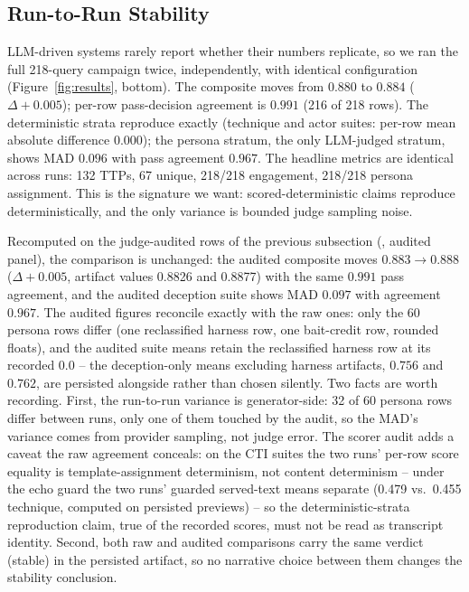

\subsection{Run-to-Run Stability}
\label{sec:stability}

LLM-driven systems rarely report whether their numbers replicate, so we
ran the full 218-query campaign twice, independently, with identical
configuration (Figure~\ref{fig:results}, bottom). The composite moves
from $0.880$ to $0.884$ ($\Delta
+0.005$); per-row pass-decision agreement is $0.991$ (216 of 218 rows).
The deterministic strata reproduce exactly (technique and actor suites:
per-row mean absolute difference $0.000$); the persona stratum, the only
LLM-judged stratum, shows MAD $0.096$ with pass agreement $0.967$. The
headline metrics are identical across runs: 132 TTPs, 67 unique,
218/218 engagement, 218/218 persona assignment. This is the signature we
want: scored-deterministic claims reproduce deterministically, and the
only variance is bounded judge sampling noise.

Recomputed on the judge-audited rows of the previous subsection
(, audited panel), the
comparison is unchanged: the audited composite moves $0.883\to0.888$
($\Delta+0.005$, artifact values 0.8826 and 0.8877) with the same $0.991$ pass
agreement, and the audited
deception suite shows MAD $0.097$ with agreement $0.967$. The audited
figures reconcile exactly with the raw ones: only the 60 persona rows
differ (one reclassified harness row, one bait-credit row, rounded
floats), and the audited suite means retain the reclassified harness
row at its recorded 0.0 -- the deception-only means excluding harness
artifacts, $0.756$ and $0.762$, are persisted alongside rather than
chosen silently. Two facts are
worth recording. First, the run-to-run variance is generator-side: 32
of 60 persona rows differ between runs, only one of them touched by the
audit, so the MAD's variance comes from provider sampling, not judge
error. The scorer audit adds a caveat the raw agreement conceals: on
the CTI suites the two runs' per-row score equality is
template-assignment determinism, not content determinism -- under the
echo guard the two runs' guarded served-text means separate (0.479
vs.\ 0.455 technique, computed on persisted previews) -- so the
deterministic-strata reproduction claim, true of the recorded scores,
must not be read as transcript identity. Second, both raw and audited comparisons carry the same
verdict (stable) in the persisted artifact, so no narrative choice
between them changes the stability conclusion.

